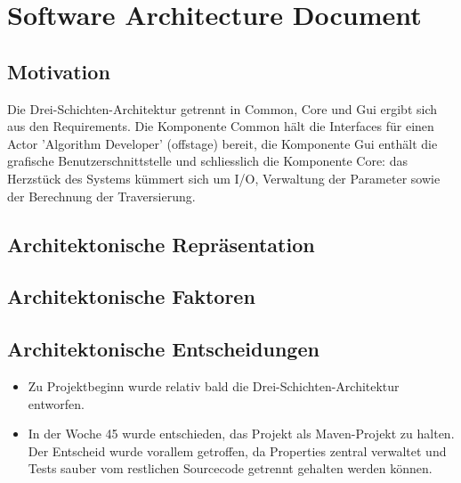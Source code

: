 \section{Software Architecture Document}
\label{sec:Software Architecture Document}
% 
\subsection{Motivation}
Die Drei-Schichten-Architektur getrennt in Common, Core und Gui ergibt sich aus den Requirements. Die Komponente Common h\"alt die Interfaces f\"ur einen Actor 'Algorithm Developer' (offstage) bereit, die Komponente Gui enth\"alt die grafische Benutzerschnittstelle und schliesslich die Komponente Core: das Herzst\"uck des Systems k\"ummert sich um I/O, Verwaltung der Parameter sowie der Berechnung der Traversierung.
% 
\subsection{Architektonische Repr\"asentation}

% 
\subsection{Architektonische Faktoren}

% 
\subsection{Architektonische Entscheidungen}
\begin{itemize}
  \item Zu Projektbeginn wurde relativ bald die Drei-Schichten-Architektur entworfen.
  \item In der Woche 45 wurde entschieden, das Projekt als Maven-Projekt zu halten. Der Entscheid wurde vorallem getroffen, da Properties zentral verwaltet und Tests sauber vom restlichen Sourcecode getrennt gehalten werden k\"onnen.
\end{itemize}
% 
